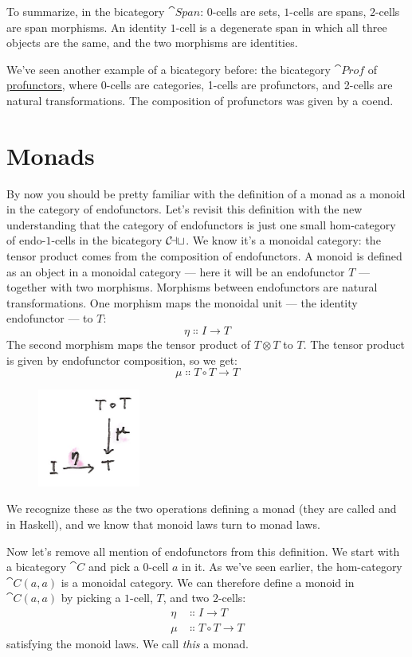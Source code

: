 \noindent
To summarize, in the bicategory $\cat{Span}$: $0$-cells are sets, $1$-cells
are spans, $2$-cells are span morphisms. An identity $1$-cell is a
degenerate span in which all three objects are the same, and the two
morphisms are identities.

We've seen another example of a bicategory before: the bicategory
$\cat{Prof}$ of
\hyperref[ends-and-coends]{profunctors},
where 0-cells are categories, 1-cells are profunctors, and 2-cells are
natural transformations. The composition of profunctors was given by a
coend.

\section{Monads}

By now you should be pretty familiar with the definition of a monad as a
monoid in the category of endofunctors. Let's revisit this definition
with the new understanding that the category of endofunctors is just one
small hom-category of endo-$1$-cells in the bicategory $\mathcal{C\mkern-3mu at}$. We
know it's a monoidal category: the tensor product comes from the
composition of endofunctors. A monoid is defined as an object in a
monoidal category --- here it will be an endofunctor $T$ ---
together with two morphisms. Morphisms between endofunctors are natural
transformations. One morphism maps the monoidal unit --- the identity
endofunctor --- to $T$:
\[\eta \Colon I \to T\]
The second morphism maps the tensor product of $T \otimes T$ to
$T$. The tensor product is given by endofunctor composition, so
we get:
\[\mu \Colon T \circ T \to T\]

\begin{figure}[H]
\centering
\includegraphics[width=0.3\textwidth]{images/monad.png}
\end{figure}

\noindent
We recognize these as the two operations defining a monad (they are
called  and  in Haskell), and we know that
monoid laws turn to monad laws.

Now let's remove all mention of endofunctors from this definition. We
start with a bicategory $\cat{C}$ and pick a $0$-cell $a$ in it.
As we've seen earlier, the hom-category $\cat{C}(a, a)$ is a monoidal
category. We can therefore define a monoid in $\cat{C}(a, a)$ by
picking a $1$-cell, $T$, and two $2$-cells:
\begin{align*}
\eta &\Colon I \to T \\
\mu &\Colon T \circ T \to T
\end{align*}
satisfying the monoid laws. We call \emph{this} a monad.

